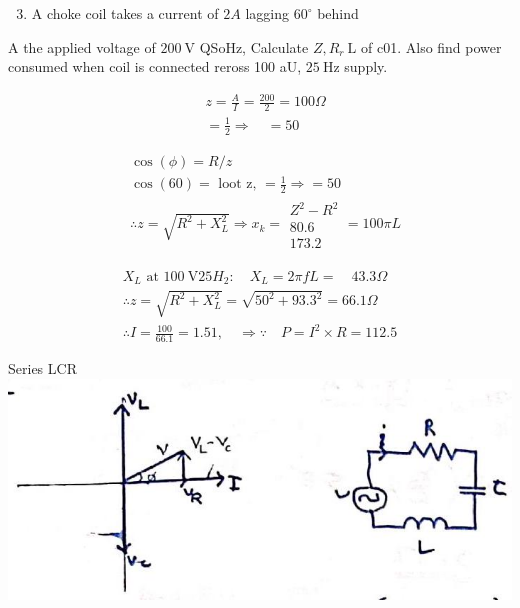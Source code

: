 \documentclass[12pt, a4paper]{article}
\begin{document}
	\begin{enumerate}
		\setcounter{enumi}{2}
		\item A choke coil takes a current of $2 A$ lagging $60^{\circ}$ behind
	\end{enumerate}

	A the applied voltage of $200 \mathrm{~V}$ QSoHz, Calculate $Z, R_{r} \mathrm{~L}$ of c01. Also find power consumed when coil is connected reross 100 aU, $25 \mathrm{~Hz}$ supply.

	$$
		\begin{aligned}
			 & z=\frac{A}{I}=\frac{200}{2}=100 \Omega \\
			 & =\frac{1}{2} \Rightarrow \quad=50
		\end{aligned}
	$$

	$$
		\begin{aligned}
			 & \cos (\phi)=R / z                                                           \\
			 & \cos (60)=\text { loot z, }=\frac{1}{2} \Rightarrow=50                      \\
			 & \therefore z=\sqrt{R^{2}+X_{L}^{2}} \Rightarrow x_{k}=\begin{array}{l}
				                                                         Z^{2}-R^{2} \\
				                                                         80.6        \\
				                                                         173.2
			                                                         \end{array}=100 \pi L
		\end{aligned}
	$$

	$$
		\begin{gathered}
			X_{L} \text { at } 100 \mathrm{~V} 25 H_{2}: \quad X_{L}=2 \pi f L=\quad 43.3 \Omega \\
			\therefore z=\sqrt{R^{2}+X_{L}^{2}}=\sqrt{50^{2}+93.3^{2}}=66.1 \Omega \\
			\therefore I=\frac{100}{66.1}=1.51, \quad \Rightarrow \because \quad P=I^{2} \times R=112.5
		\end{gathered}
	$$

	Series LCR\\
	\includegraphics[max width=\textwidth, center]{2024_06_15_74bbabba7981675b0d49g-08}
\end{document}
